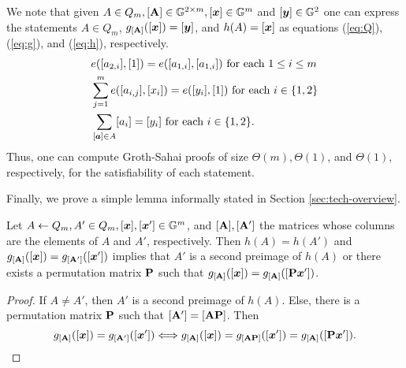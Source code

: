 We note that given $A\in Q_m,[\mathbf{{A}}]\in\mathbb{G}^{2\times m},[{\boldsymbol{x}}]\in\mathbb{G}^m$ and $[{\boldsymbol{y}}]\in\mathbb{G}^2$ one can express the statements $A\in Q_m$, $g_{[\mathbf{{A}}]}([{\boldsymbol{x}}])=[{\boldsymbol{y}}]$, and $h(A)=[{\boldsymbol{x}}]$ as equations (\ref{eq:Q}),(\ref{eq:g}), and (\ref{eq:h}), respectively.
 \begin{align}
&e([a_{2,i}],[1])=e([a_{1,i}],[a_{1,i}]) \text{ for each } 1\leq i\leq m \label{eq:Q}\\
&\sum_{j=1}^m e([a_{i,j}],[x_i]) = e([y_i],[1]) \text{ for each } i\in\{1,2\} \label{eq:g}\\
&\sum_{[{\boldsymbol{a}}]\in A} [a_i] = [y_i] \text{ for each } i\in\{1,2\}.\label{eq:h}
\end{align}
Thus, one can compute Groth-Sahai proofs of size $\Theta(m),\Theta(1)$, and $\Theta(1)$, respectively, for the satisfiability of each statement.

Finally, we prove a simple lemma informally stated in Section \ref{sec:tech-overview}.
\begin{lemma}\label{lemma:hg}
Let $A\gets Q_m,A'\in Q_m,[{\boldsymbol{x}}],[{\boldsymbol{x}}']\in\mathbb{G}^m$, and $[\mathbf{{A}}],[\mathbf{{A}}']$ the matrices whose columns are the elements of $A$ and $A'$, respectively. Then $h(A)=h(A')$ and $g_{[\mathbf{{A}}]}([{\boldsymbol{x}}])=g_{[\mathbf{{A}}']}([{\boldsymbol{x}}'])$ implies that $A'$ is a second preimage of $h(A)$ or there exists a permutation matrix $\mathbf{{P}}$ such that $g_{[\mathbf{{A}}]}([{\boldsymbol{x}}])=g_{[\mathbf{{A}}]}([\mathbf{{P}}{\boldsymbol{x}}'])$.
\end{lemma}
\begin{proof}
If $A\neq A'$, then $A'$ is a second preimage of $h(A)$. Else, there is a permutation matrix $\mathbf{{P}}$ such that $[\mathbf{{A}}'] =[\mathbf{{A}}\mathbf{{P}}]$. Then
$$
 g_{[\mathbf{{A}}]}([{\boldsymbol{x}}])=g_{[\mathbf{{A}}']}([{\boldsymbol{x}}'])\Longleftrightarrow  g_{[\mathbf{{A}}]}([{\boldsymbol{x}}])=g_{[\mathbf{{A}}\mathbf{{P}}]}([{\boldsymbol{x}}'])=g_{[\mathbf{{A}}]}([\mathbf{{P}}{\boldsymbol{x}}']).
$$
\end{proof}
